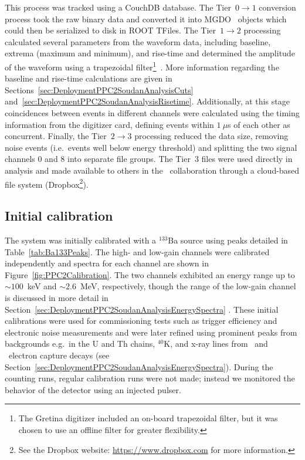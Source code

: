 	This process was tracked using a CouchDB database.  The Tier~$0\to1$ conversion process took the raw binary data and converted it into MGDO \cpp~objects which could then be serialized to disk in ROOT TFiles.  The Tier~$1\to2$ processing calculated several parameters from the waveform data, including baseline, extrema (maximum and minimum), and rise-time and determined the amplitude of the waveform using a trapezoidal filter\footnote{The Gretina digitizer included an on-board trapezoidal filter, but it was chosen to use an offline filter for greater flexibility.}~\cite{Jor94}.  More information regarding the baseline and rise-time calculations are given in Sections~\ref{sec:DeploymentPPC2SoudanAnalysisCuts} and~\ref{sec:DeploymentPPC2SoudanAnalysisRisetime}.  Additionally, at this stage coincidences between events in different channels were calculated using the timing information from the digitizer card, defining events within $1~\mu$s of each other as concurrent.   Finally, the Tier~$2\to3$ processing reduced the data size, removing noise events (i.e.~events well below energy threshold) and splitting the two signal channels 0 and 8 into separate file groups.  The Tier~3 files were used directly in analysis and made available to others in the \MJ~collaboration through a cloud-based file system (Dropbox\footnote{See the Dropbox website: \url{https://www.dropbox.com} for more information.}).
	
		\subsection{Initial calibration}
		\label{sec:DeploymentPPC2SoudanAnalysisCalibration}    
			
	The system was initially calibrated with a $^{133}$Ba source using peaks detailed in Table~\ref{tab:Ba133Peaks}.  The high- and low-gain channels were calibrated independently and spectra for each channel are shown in Figure~\ref{fig:PPC2Calibration}.  The two channels exhibited an energy range up to $\sim100$~keV and $\sim 2.6$~MeV, respectively, though the range of the low-gain channel is discussed in more detail in Section~\ref{sec:DeploymentPPC2SoudanAnalysisEnergySpectra} .  These initial calibrations were used for commissioning tests such as trigger efficiency and electronic noise measurements and were later refined using prominent peaks from backgrounds e.g.~in the U and Th chains, $^{40}$K, and x-ray lines from \gersixeight~and \znsixfive~electron capture decays (see Section~\ref{sec:DeploymentPPC2SoudanAnalysisEnergySpectra}).  During the counting runs, regular calibration runs were not made; instead we monitored the behavior of the detector using an injected pulser.  

